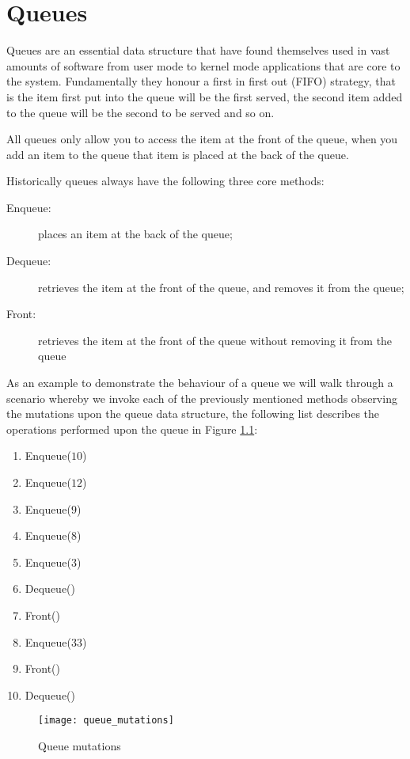 \chapter{Queues}
Queues are an essential data structure that have found themselves used in vast amounts of software from user mode to kernel mode applications that are core to the system. Fundamentally they honour a first in first out (FIFO) strategy, that is the item first put into the queue will be the first served, the second item added to the queue will be the second to be served and so on.

All queues only allow you to access the item at the front of the queue, when you add an item to the queue that item is placed at the back of the queue.

Historically queues always have the following three core methods:

\begin{description}
\item[Enqueue:] places an item at the back of the queue;
\item[Dequeue:] retrieves the item at the front of the queue, and removes it from the queue;
\item[Front:] retrieves the item at the front of the queue without removing it from the queue
\end{description}

As an example to demonstrate the behaviour of a queue we will walk through a scenario whereby we invoke each of the previously mentioned methods observing the mutations upon the queue data structure, the following list describes the operations performed upon the queue in Figure \ref{fig:queue_mutations}:

\begin{enumerate}
\item Enqueue($10$)
\item Enqueue($12$)
\item Enqueue($9$)
\item Enqueue($8$)
\item Enqueue($3$)
\item Dequeue()
\item Front()
\item Enqueue($33$)
\item Front()
\item Dequeue()
\end{enumerate}

\begin{figure}
\begin{center}
\texttt{[image: queue\_mutations]}
\end{center}
\caption{Queue mutations} \label{fig:queue_mutations}
\end{figure}


